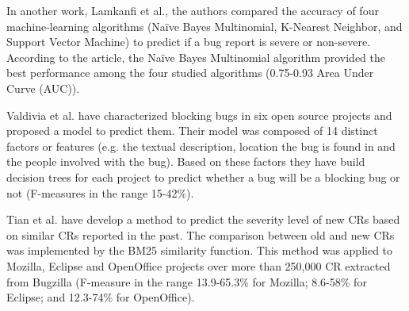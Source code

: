 \documentclass[10pt, conference]{IEEEtran}
\begin{document}
In another work, Lamkanfi et al.\cite{Lamkanfi2011}, the authors compared the accuracy of four machine-learning algorithms (Naïve Bayes Multinomial, K-Nearest Neighbor, and Support Vector Machine) to predict if a bug report is severe or non-severe. According to the article, the Naïve Bayes Multinomial algorithm provided the best performance among the four studied algorithms (0.75-0.93 Area Under Curve (AUC)).

Valdivia et al.\cite{ValdiviaGarcia2014} have characterized blocking bugs in six open source projects and proposed a model to predict them. Their model was composed of 14 distinct factors or features (e.g. the textual description, location the bug is found in and the people involved with the bug). Based on these factors they have build decision trees for each project to predict whether a bug will be a blocking bug or not (F-measures in the range 15-42\%).

Tian et al.\cite{Tian2012} have develop a method to predict the severity level of new CRs based on similar CRs reported in the past. The comparison between old and new CRs was implemented by the BM25 similarity function. This method was applied to Mozilla, Eclipse and OpenOffice projects over more than 250,000 CR extracted from Bugzilla (F-measure in the range 13.9-65.3\% for Mozilla; 8.6-58\% for Eclipse; and 12.3-74\% for OpenOffice). 
\end{document}

